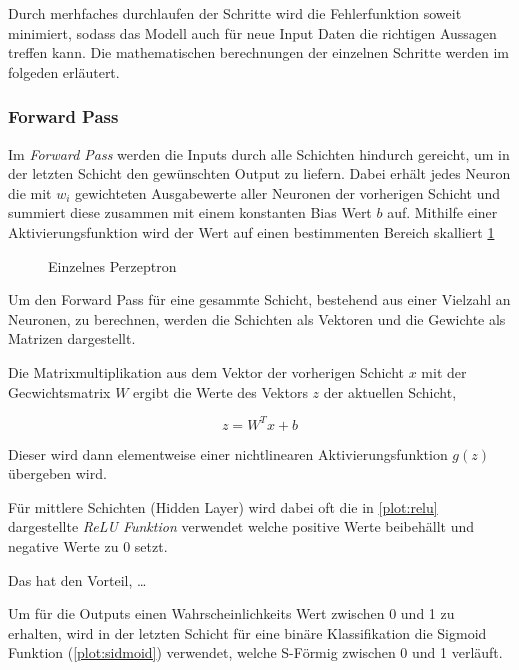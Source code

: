 Durch merhfaches durchlaufen der Schritte wird die Fehlerfunktion soweit minimiert, 
sodass das Modell auch für neue Input Daten die richtigen Aussagen treffen kann.
Die mathematischen berechnungen der einzelnen Schritte werden im folgeden erläutert.


\subsubsection{Forward Pass}
Im \textit{Forward Pass} werden die Inputs durch alle Schichten hindurch 
gereicht, um in der letzten Schicht den gewünschten Output zu liefern.
Dabei erhält jedes Neuron die mit $w_{i}$ gewichteten Ausgabewerte aller
Neuronen der vorherigen Schicht und summiert diese zusammen mit einem konstanten 
Bias Wert $b$ auf. 
Mithilfe einer Aktivierungsfunktion wird der Wert auf einen bestimmenten Bereich 
skalliert \ref{fig:neuron}


\begin{figure}[H]
    \centering
    \label{fig:neuron}
    
    \caption{Einzelnes Perzeptron}
\end{figure}


Um den Forward Pass für eine gesammte Schicht, bestehend aus 
einer Vielzahl an Neuronen, zu berechnen, werden die Schichten 
als Vektoren und die Gewichte als Matrizen dargestellt.

Die Matrixmultiplikation aus dem Vektor der vorherigen 
Schicht $x$ mit der Gecwichtsmatrix $W$ ergibt die Werte
des Vektors $z$ der aktuellen Schicht,

\begin{equation}
    \label{eq:forward}
    z = W^{T}x+b
\end{equation}

Dieser wird dann elementweise einer nichtlinearen Aktivierungsfunktion
$g(z)$ übergeben wird.

Für mittlere Schichten (Hidden Layer) wird dabei oft die in \ref{plot:relu} dargestellte
\textit{ReLU Funktion} verwendet welche positive Werte beibehällt und negative 
Werte zu 0 setzt.

Das hat den Vorteil, \dots

Um für die Outputs einen Wahrscheinlichkeits Wert zwischen 0 und 1 
zu erhalten, wird in der letzten Schicht für eine binäre Klassifikation 
die Sigmoid Funktion (\ref{plot:sidmoid}) verwendet,
welche S-Förmig zwischen 0 und 1 verläuft.

\vspace{1cm}

